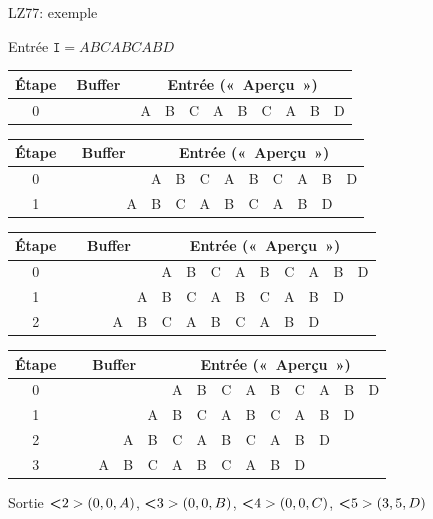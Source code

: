 \documentclass[10pt]{beamer}
\newcommand{\guill}[1]{«~#1~»}
\begin{document}
\begin{frame}{LZ77: exemple}
\begin{block}{Entrée}
$\texttt{I}=ABCABCABD$
\end{block}

\bigskip

 {
\begin{tabular}{|c|c|c|c|c|c|c|c|c|c|c|c|c|c|c|}
\hline
\textbf{Étape}&\multicolumn{5}{|c|}{\textbf{Buffer}} & \multicolumn{9}{|c|}{\textbf{Entrée} (\guill{Aperçu})} \\
\hline
0&&&&&&A&B&C&A&B&C&A&B&D\\
\hline
\end{tabular}}

 {
\begin{tabular}{|c|c|c|c|c|c|c|c|c|c|c|c|c|c|c|}
\hline
\textbf{Étape}&\multicolumn{5}{|c|}{\textbf{Buffer}} & \multicolumn{9}{|c|}{\textbf{Entrée} (\guill{Aperçu})} \\
\hline
0&&&&&&A&B&C&A&B&C&A&B&D\\
\hline
1&&&&&A&B&C&A&B&C&A&B&D&\\
\hline
\end{tabular}}

 {
\begin{tabular}{|c|c|c|c|c|c|c|c|c|c|c|c|c|c|c|}
\hline
\textbf{Étape}&\multicolumn{5}{|c|}{\textbf{Buffer}} & \multicolumn{9}{|c|}{\textbf{Entrée} (\guill{Aperçu})} \\
\hline
0&&&&&&A&B&C&A&B&C&A&B&D\\
\hline
1&&&&&A&B&C&A&B&C&A&B&D&\\
\hline
2&&&&A&B&C&A&B&C&A&B&D&&\\
\hline
\end{tabular}}

 {
\begin{tabular}{|c|c|c|c|c|c|c|c|c|c|c|c|c|c|c|}
\hline
\textbf{Étape}&\multicolumn{5}{|c|}{\textbf{Buffer}} & \multicolumn{9}{|c|}{\textbf{Entrée} (\guill{Aperçu})} \\
\hline
0&&&&&&A&B&C&A&B&C&A&B&D\\
\hline
1&&&&&A&B&C&A&B&C&A&B&D&\\
\hline
2&&&&A&B&C&A&B&C&A&B&D&&\\
\hline
3&&&A&B&C&A&B&C&A&B&D&&&\\
\hline
\end{tabular}}

\bigskip

\begin{block}{Sortie}
$\textbf<2>{(0,0,A)}$,
$\textbf<3>{(0,0,B)}$,
$\textbf<4>{(0,0,C)}$,
$\textbf<5>{(3,5,D)}$
\end{block}
\end{frame}
\end{document}
